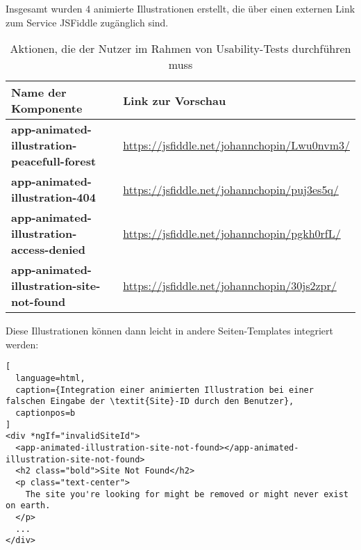 Insgesamt wurden 4 animierte Illustrationen erstellt, die über einen externen Link zum Service JSFiddle zugänglich sind.

\begin{table}[H]
  \begin{tabular}{p{0.5\linewidth} | p{0.5\linewidth}}
    Name der Komponente                                 & Link zur Vorschau                                                                               \\ \hline\hline

    \textbf{app-animated-illustration-peacefull-forest} & \href{https://jsfiddle.net/johannchopin/Lwu0nvm3/}{https://jsfiddle.net/johannchopin/Lwu0nvm3/} \\\hline
    \textbf{app-animated-illustration-404}              & \href{https://jsfiddle.net/johannchopin/puj3es5q/}{https://jsfiddle.net/johannchopin/puj3es5q/} \\\hline
    \textbf{app-animated-illustration-access-denied}    & \href{https://jsfiddle.net/johannchopin/pgkh0rfL/}{https://jsfiddle.net/johannchopin/pgkh0rfL/} \\\hline
    \textbf{app-animated-illustration-site-not-found}   & \href{https://jsfiddle.net/johannchopin/30js2zpr/}{https://jsfiddle.net/johannchopin/30js2zpr/}
  \end{tabular}
  \caption{Aktionen, die der Nutzer im Rahmen von Usability-Tests durchführen muss}
\end{table}

Diese Illustrationen können dann leicht in andere Seiten-Templates integriert werden:

\begin{lstlisting}[
  language=html,
  caption={Integration einer animierten Illustration bei einer falschen Eingabe der \textit{Site}-ID durch den Benutzer},
  captionpos=b
]
<div *ngIf="invalidSiteId">
  <app-animated-illustration-site-not-found></app-animated-illustration-site-not-found>
  <h2 class="bold">Site Not Found</h2>
  <p class="text-center">
    The site you're looking for might be removed or might never exist on earth.
  </p>
  ...
</div>
\end{lstlisting}

